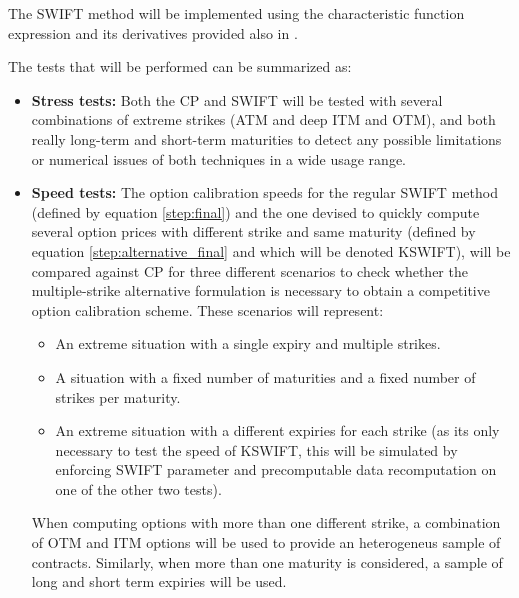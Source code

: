 \documentclass[12,twoside]{mammeTFM}
\theoremstyle{definition}
\theoremstyle{remark}
\begin{document}
The SWIFT method will be implemented using the characteristic function expression and its derivatives provided also in \cite{cui17}.


The tests that will be performed can be summarized as:
\begin{itemize}

\item \textbf{Stress tests:}
Both the CP and SWIFT will be tested with several combinations of extreme strikes (ATM and deep ITM and OTM), and both really long-term and short-term maturities to detect any possible limitations or numerical issues of both techniques in a wide usage range.

\item \textbf{Speed tests:}
The option calibration speeds for the regular SWIFT method (defined by equation \ref{step:final}) and the one devised to quickly compute several option prices with different strike and same maturity (defined by equation \ref{step:alternative_final} and which will be denoted KSWIFT), will be compared against CP for three different scenarios to check whether the multiple-strike alternative formulation is necessary to obtain a competitive option calibration scheme. These scenarios will represent:
\begin{itemize}
\item An extreme situation with a single expiry and multiple strikes.
\item A situation with a fixed number of maturities and a fixed number of strikes per maturity.
\item An extreme situation with a different expiries for each strike (as its only necessary to test the speed of KSWIFT, this will be simulated by enforcing SWIFT parameter and precomputable data recomputation on one of the other two tests).
\end{itemize}

When computing options with more than one different strike, a combination of OTM and ITM options will be used to provide an heterogeneus sample of contracts. Similarly, when more than one maturity is considered, a sample of long and short term expiries will be used.



\end{itemize}
\end{document}
